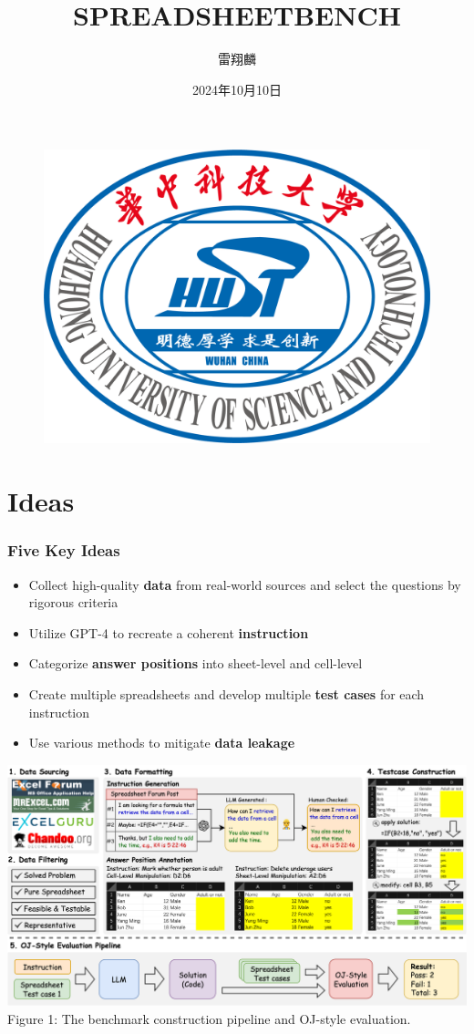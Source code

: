 \documentclass{beamer}
\author{雷翔麟}
\title{SPREADSHEETBENCH}
\institute{华中科技大学计算机科学与技术学院}
\date{2024年10月10日}
\begin{document}
\kaishu
\begin{frame}
    \titlepage
    \begin{figure}[htpb]
        \begin{center}
            \includegraphics[width=0.2\linewidth]{pic/HUST_LOGO.png}
        \end{center}
    \end{figure}
\end{frame}

\begin{frame}
    \tableofcontents[sectionstyle=show,subsectionstyle=show/shaded/hide,subsubsectionstyle=show/shaded/hide]
\end{frame}

\section{Ideas}

\begin{frame}
    \frametitle{Five Key Ideas}
    \begin{itemize}
        \item Collect high-quality \textbf{data} from real-world sources and select the questions by rigorous criteria
        \item Utilize GPT-4 to recreate a coherent \textbf{instruction}
        \item Categorize \textbf{answer positions} into sheet-level and cell-level
        \item Create multiple spreadsheets and develop multiple \textbf{test cases} for each instruction
        \item Use various methods to mitigate \textbf{data leakage}
    \end{itemize}
\end{frame}

\begin{frame}
    \centering
    \includegraphics[width=1\linewidth]{pic/construction pipeline.png}
    \vspace{0.2cm}
    {\footnotesize Figure 1: The benchmark construction pipeline and OJ-style evaluation.}
\end{frame}
\end{document}
